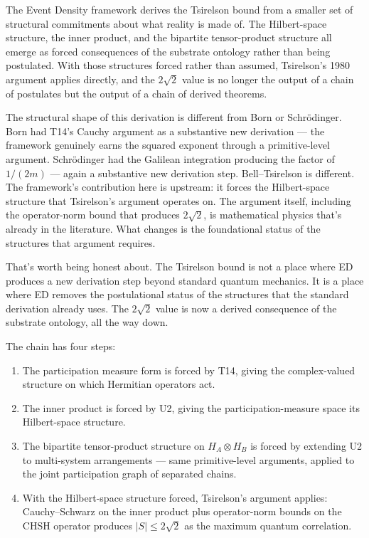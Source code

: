 \documentclass[11pt,a4paper]{article}
\begin{document}
The Event Density framework derives the Tsirelson bound from a smaller set of structural commitments about what reality is made of. The Hilbert-space structure, the inner product, and the bipartite tensor-product structure all emerge as forced consequences of the substrate ontology rather than being postulated. With those structures forced rather than assumed, Tsirelson's 1980 argument applies directly, and the $2\sqrt{2}$ value is no longer the output of a chain of postulates but the output of a chain of derived theorems.

The structural shape of this derivation is different from Born or Schr\"odinger. Born had T14's Cauchy argument as a substantive new derivation --- the framework genuinely earns the squared exponent through a primitive-level argument. Schr\"odinger had the Galilean integration producing the factor of $1/(2m)$ --- again a substantive new derivation step. Bell--Tsirelson is different. The framework's contribution here is upstream: it forces the Hilbert-space structure that Tsirelson's argument operates on. The argument itself, including the operator-norm bound that produces $2\sqrt{2}$, is mathematical physics that's already in the literature. What changes is the foundational status of the structures that argument requires.

That's worth being honest about. The Tsirelson bound is not a place where ED produces a new derivation step beyond standard quantum mechanics. It is a place where ED removes the postulational status of the structures that the standard derivation already uses. The $2\sqrt{2}$ value is now a derived consequence of the substrate ontology, all the way down.

The chain has four steps:
\begin{enumerate}[noitemsep]
  \item The participation measure form is forced by T14, giving the complex-valued structure on which Hermitian operators act.
  \item The inner product is forced by U2, giving the participation-measure space its Hilbert-space structure.
  \item The bipartite tensor-product structure on $H_A \otimes H_B$ is forced by extending U2 to multi-system arrangements --- same primitive-level arguments, applied to the joint participation graph of separated chains.
  \item With the Hilbert-space structure forced, Tsirelson's argument applies: Cauchy--Schwarz on the inner product plus operator-norm bounds on the CHSH operator produces $|S| \leq 2\sqrt{2}$ as the maximum quantum correlation.
\end{enumerate}
\end{document}
